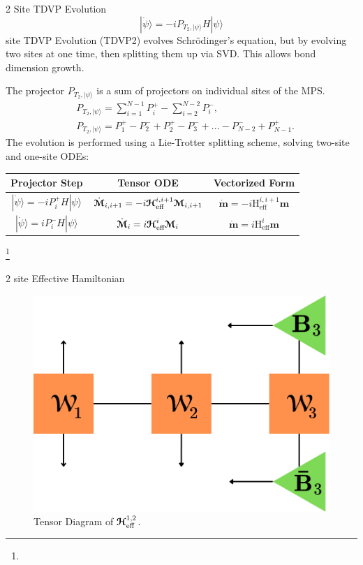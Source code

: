 \documentclass{beamer}
\newcommand{\euler}[1]{\boldsymbol{\EuScript{#1}}}
\newcommand{\romanL}[1]{\boldsymbol{\mathrm{#1}}}
\newcommand\blfootnote[1]{%
  \begingroup
  \renewcommand\thefootnote{}\footnote{#1}%
  \addtocounter{footnote}{-1}%
  \endgroup
}
\begin{document}
\begin{frame}{2 Site TDVP Evolution}
    \small
    \begin{equation}
        |\dot{\psi}\rangle = -iP_{T_2, |\psi\rangle}H|\psi\rangle
    \end{equation}
     site TDVP Evolution (TDVP2) evolves Schrödinger's equation, but by evolving two sites at one time, then splitting them up via SVD. This allows bond dimension growth.     
    
    The projector $P_{T_2, |\psi\rangle}$ is a sum of projectors on individual sites of the MPS. 
    \begin{align}
        &P_{T_2, |\psi\rangle} = \sum_{i = 1}^{N - 1}P_i^{+} - \sum_{i = 2}^{N - 2}P_i^{-}\nonumber, \\ 
        &P_{T_2, |\psi\rangle} = P^{+}_1 - P^{-}_2 + P_2^{+}-P_3^{-} + ... - P_{N - 2}^{-} + P_{N-1}^{+}.
    \end{align}    
    \pause
    The evolution is performed using a Lie-Trotter splitting scheme, solving two-site and one-site ODEs:
    \begin{center}
    \renewcommand{\arraystretch}{1.6}
    \begin{tabular}{|c|c|c|}
        \hline
        \textbf{Projector Step} & \textbf{Tensor ODE} & \textbf{Vectorized Form} \\
        \hline
        $|\dot{\psi}\rangle = -iP_i^+H|\psi\rangle$ & $\dot{\euler{M}}_{i,i + 1} = -i\euler{H}_{\textrm{eff}}^{i, i + 1} \euler{M}_{i, i + 1}$ & $\dot{\boldsymbol{m}} = -i\romanL{H}_{\textrm{eff}}^{i, i + 1} \boldsymbol{m}$ \\
        \hline
        $|\dot{\psi}\rangle = iP_i^-H|\psi\rangle$ & $\dot{\euler{M}}_i= i\euler{H}_{\textrm{eff}}^i \euler{M}_i$ & $\dot{\boldsymbol{m}} = i\romanL{H}_{\textrm{eff}}^i \boldsymbol{m}$ \\
        \hline
    \end{tabular}
    \end{center}
    \blfootnote{
    }
\end{frame}

\begin{frame}{2 site Effective Hamiltonian}

    \begin{figure}
        \centering
        \includegraphics[width=0.7\linewidth]{images/Effective_Hamiltonians/2Site_Eff.png}
        \caption{Tensor Diagram of $\euler{H}_{\textrm{eff}}^{1,2}$.}
        \label{fig:Keff}
    \end{figure}
\end{frame}
\end{document}
